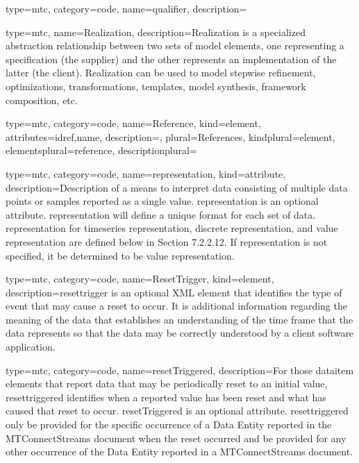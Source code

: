 {
  type=mtc,
  category=code,
  name={qualifier},
  description={}
}


{
  type=mtc,
  name={Realization},
  description={Realization is a specialized abstraction relationship between two sets of model elements, one representing a specification (the supplier) and the other represents an implementation of the latter (the client). Realization can be used to model stepwise refinement, optimizations, transformations, templates, model synthesis, framework composition, etc.}
}


{
  type=mtc,
  category=code,
  name={Reference},
  kind={element},
  attributes={\gls{idref},\gls{name}},
  description={},
  plural={References},
  kindplural={element},
  elementsplural={\gls{reference}},
  descriptionplural={}
}


{
  type=mtc,
  category=code,
  name={representation},
  kind={attribute},
  description={Description of a means to interpret data consisting of multiple data points or samples reported as a single value.  \newline \gls{representation} is an optional attribute.  \newline \gls{representation} will define a unique format for each set of data.  \newline \gls{representation} for \gls{timeseries representation}, \gls{discrete representation}, and \gls{value representation} are defined below in Section {\color{red} 7.2.2.12}.  \newline If \gls{representation} is not specified, it \MUST be determined to be \gls{value representation}.}
}


{
  type=mtc,
  category=code,
  name={ResetTrigger},
  kind={element},
  description={\gls{resettrigger} is an optional XML element that identifies the type of event that may cause a reset to occur. It is additional information regarding the meaning of the data that establishes an understanding of the time frame that the data represents so that the data may be correctly understood by a client software application.}
}


{
  type=mtc,
  category=code,
  name={resetTriggered},
  description={For those \gls{dataitem} elements that report data that may be periodically reset to an initial value, \gls{resettriggered} identifies when a reported value has been reset and what has caused that reset to occur.  \newline resetTriggered is an optional attribute.  \newline \gls{resettriggered} \MUST only be provided for the specific occurrence of a Data Entity reported in the MTConnectStreams document when the reset occurred and \MUSTNOT be provided for any other occurrence of the Data Entity reported in a MTConnectStreams document.}
}


